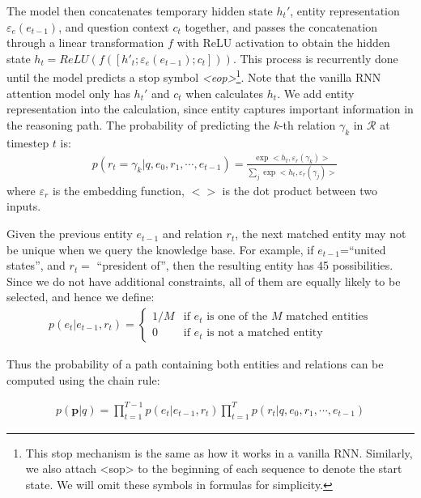 The model then concatenates temporary hidden state $h_{t}'$, entity representation $\varepsilon_e(e_{t-1})$, and question context $c_t$ together, and passes the concatenation through a linear transformation $f$ with ReLU activation to obtain the hidden state $h_t=ReLU(f([h'_{t}; \varepsilon_e(e_{t-1}); c_t]))$. This process is recurrently done until the model predicts a stop symbol \textit{<eop>}\footnote{This stop mechanism is the same as how it works in a vanilla RNN. Similarly, we also attach <sop> to the beginning of each sequence to denote the start state. We will omit these symbols in formulas for simplicity.}. Note that the vanilla RNN attention model only has $h_{t}'$ and $c_t$ when calculates $h_t$. We add entity representation into the calculation, since entity captures important information in the reasoning path. The probability of predicting the $k$-th relation $\gamma_k$ in $\mathcal{R}$ at timestep $t$ is:
\begin{align*}
&p(r_t=\gamma_k|q,e_0,r_1,\cdots,e_{t-1})= \frac{\exp <h_t,\varepsilon_r(\gamma_k)>}{\sum_j\exp <h_t,\varepsilon_r(\gamma_j)>}
\end{align*}
where $\varepsilon_r$ is the embedding function, $<>$ is the dot product between two inputs.


Given the previous entity $e_{t-1}$ and relation $r_t$, the next matched entity may not be unique when we query the knowledge base. %
For example, if $e_{t-1}$=``united states'', and $r_t=$ ``president of'', then the resulting entity has 45 possibilities. Since we do not have additional constraints, all of them are equally likely to be selected, and hence we define:
\begin{align}
  p(e_t|e_{t-1},r_t)
  =\begin{cases}
  1/M & \text{if }e_t\text{ is one of the }M\text{ matched entities} \\
  0 & \text{if }e_t\text{ is not a matched entity}
\end{cases} 
\end{align}

Thus the probability of a path containing both entities and relations can be computed using the chain rule:

\begin{align}
p(\mathbf{p}|q)\nonumber
= \prod_{t=1}^{T-1}p(e_t|e_{t-1},r_t)\prod_{t=1}^{T}p(r_t|q,e_0,r_1,\cdots,e_{t-1}) 
\end{align}

